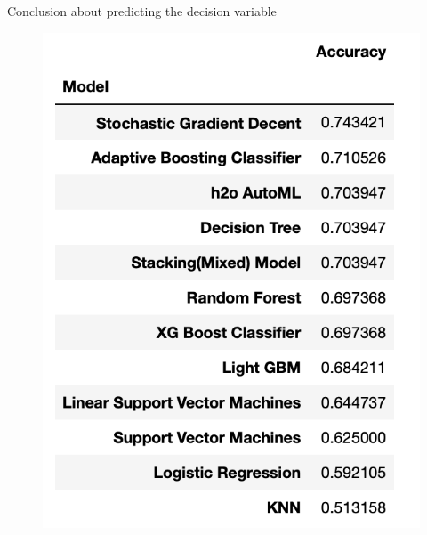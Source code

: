 \documentclass[11pt]{beamer}
\begin{document}
\begin{frame}{Conclusion about predicting the decision variable}
\begin{figure}
	\centering
	\includegraphics[scale =0.50]{TableDecisionConclusion}
\end{figure}		
\end{frame}
\end{document}

